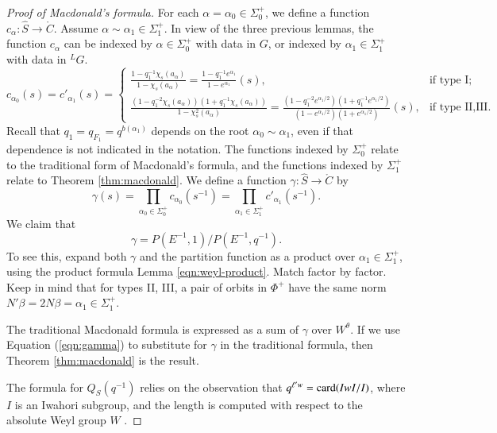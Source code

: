 \begin{proof}[Proof of Macdonald's formula]
For each $\alpha=\alpha_0\in\Sigma^+_0$, we define
 a function $c_{\alpha}:\hat S\to\ring{C}$.
Assume $\alpha\sim \alpha_1\in \Sigma^+_1$.
In view of the three previous lemmas, the function $c_\alpha$ can be indexed by $\alpha\in\Sigma^+_0$
 with data in $G$, or indexed by  $\alpha_1\in\Sigma^+_1$ with
data in ${}^LG$.  
\[
c_{\alpha_0}(s) = c'_{\alpha_1}(s)=\begin{cases}
\frac{1 - q^{-1}_1 \chi_s (a_{\alpha})} {1 -\chi_s(a_{\alpha})} =
\frac{1 - q^{-1}_1 e^{\alpha_1}} {1 -e^{\alpha_1}} (s),
& \text{if type I;}\\[1em]
\frac{(1 - q^{-2}_1 \chi_s (a_{\alpha}))(1+ q^{-1}_1 \chi_s(a_\alpha))} {1 -\chi^2_s(a_{\alpha})} =
\frac{(1 - q^{-2}_1 e^{\alpha_1/2})(1+ q^{-1}_1 e^{\alpha_1/2})} {(1 - e^{\alpha_1/2})(1+e^{\alpha_1/2})} (s),
& \text{if type II,III}.
\end{cases}
\]
Recall that $q_1 = q_{F_1} = q^{b(\alpha_1)}$ depends on the root $\alpha_0\sim\alpha_1$, even if that dependence is not
indicated in the notation.
The functions indexed by $\Sigma^+_0$ relate to the traditional form of Macdonald's formula,
and the functions indexed by $\Sigma^+_1$ relate to Theorem \ref{thm:macdonald}.
We define a function $\gamma:\hat S\to \ring{C}$ by
\[
\gamma(s) = \prod_{\alpha_0\in \Sigma^+_0} c_{\alpha_0}(s^{-1}) = \prod_{\alpha_1\in \Sigma^+_1} c'_{\alpha_1}(s^{-1}).
\]
We claim that
\begin{equation}\label{eqn:gamma}
\gamma = P(E^{-1},1)/P(E^{-1},q^{-1}).
\end{equation}
To see this, expand both $\gamma$ and the partition function as a product over $\alpha_1\in \Sigma^+_1$,
using the product formula Lemma \ref{eqn:weyl-product}.  Match
factor by factor.  
Keep in mind that for types II, III, a pair of orbits in $\Phi^+$ have the same norm $N'\beta = 2N\beta=\alpha_1\in\Sigma^+_1$.

The traditional Macdonald formula is expressed as a sum of $\gamma$ over $W^\theta$.
If we use Equation (\ref{eqn:gamma}) to substitute for $\gamma$ in the traditional formula,
then Theorem \ref{thm:macdonald} is the result.

The formula for $Q_S(q^{-1})$ relies on the observation that $q^{\ell' w} = {\operatorname{card}}(IwI/I)$, where $I$
is an Iwahori subgroup, and the length is computed with respect to the absolute Weyl group $W$ \cite[p.74]{carter1985finite}.
\end{proof}

